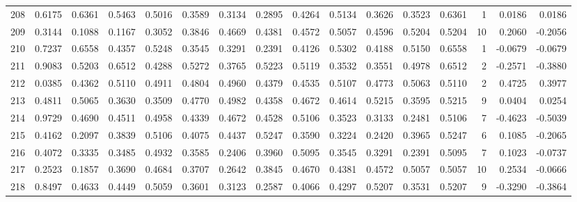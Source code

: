 \begin{tabular}{lrrrrrrrrrrrrrrr}
208 &      0.6175 &  0.6361 &  0.5463 &  0.5016 &  0.3589 &  0.3134 &  0.2895 &  0.4264 &  0.5134 &  0.3626 &   0.3523 &     0.6361 &      1 &                    0.0186 &                     0.0186 \\
209 &      0.3144 &  0.1088 &  0.1167 &  0.3052 &  0.3846 &  0.4669 &  0.4381 &  0.4572 &  0.5057 &  0.4596 &   0.5204 &     0.5204 &     10 &                    0.2060 &                    -0.2056 \\
210 &      0.7237 &  0.6558 &  0.4357 &  0.5248 &  0.3545 &  0.3291 &  0.2391 &  0.4126 &  0.5302 &  0.4188 &   0.5150 &     0.6558 &      1 &                   -0.0679 &                    -0.0679 \\
211 &      0.9083 &  0.5203 &  0.6512 &  0.4288 &  0.5272 &  0.3765 &  0.5223 &  0.5119 &  0.3532 &  0.3551 &   0.4978 &     0.6512 &      2 &                   -0.2571 &                    -0.3880 \\
212 &      0.0385 &  0.4362 &  0.5110 &  0.4911 &  0.4804 &  0.4960 &  0.4379 &  0.4535 &  0.5107 &  0.4773 &   0.5063 &     0.5110 &      2 &                    0.4725 &                     0.3977 \\
213 &      0.4811 &  0.5065 &  0.3630 &  0.3509 &  0.4770 &  0.4982 &  0.4358 &  0.4672 &  0.4614 &  0.5215 &   0.3595 &     0.5215 &      9 &                    0.0404 &                     0.0254 \\
214 &      0.9729 &  0.4690 &  0.4511 &  0.4958 &  0.4339 &  0.4672 &  0.4528 &  0.5106 &  0.3523 &  0.3133 &   0.2481 &     0.5106 &      7 &                   -0.4623 &                    -0.5039 \\
215 &      0.4162 &  0.2097 &  0.3839 &  0.5106 &  0.4075 &  0.4437 &  0.5247 &  0.3590 &  0.3224 &  0.2420 &   0.3965 &     0.5247 &      6 &                    0.1085 &                    -0.2065 \\
216 &      0.4072 &  0.3335 &  0.3485 &  0.4932 &  0.3585 &  0.2406 &  0.3960 &  0.5095 &  0.3545 &  0.3291 &   0.2391 &     0.5095 &      7 &                    0.1023 &                    -0.0737 \\
217 &      0.2523 &  0.1857 &  0.3690 &  0.4684 &  0.3707 &  0.2642 &  0.3845 &  0.4670 &  0.4381 &  0.4572 &   0.5057 &     0.5057 &     10 &                    0.2534 &                    -0.0666 \\
218 &      0.8497 &  0.4633 &  0.4449 &  0.5059 &  0.3601 &  0.3123 &  0.2587 &  0.4066 &  0.4297 &  0.5207 &   0.3531 &     0.5207 &      9 &                   -0.3290 &                    -0.3864 \\

\end{tabular}
